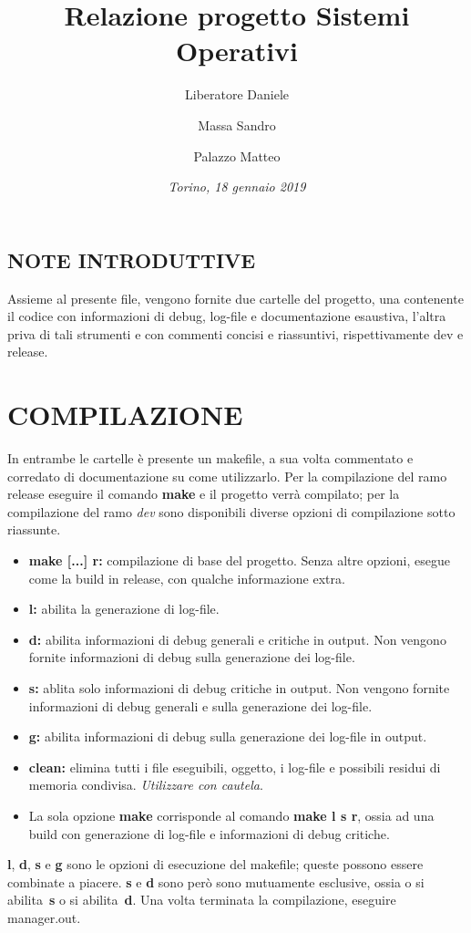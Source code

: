 \documentclass[a4paper,11pt]{article}
\newcommand{\cambiaFont}[2]{{\fontencoding{T1}\fontfamily{#1}%
\selectfont#2}}
\begin{document}
\author{Liberatore Daniele \and Massa Sandro \and Palazzo Matteo}
\title{Relazione progetto Sistemi Operativi}
\date{\textit{Torino, 18 gennaio 2019}}
\maketitle

\subsection*{NOTE INTRODUTTIVE}
Assieme al presente file, vengono fornite due cartelle del progetto, una contenente il codice con informazioni di debug, log-file e documentazione esaustiva, l’altra priva di tali strumenti e con commenti concisi e riassuntivi, rispettivamente \cambiaFont{pcr}{dev} e \cambiaFont{pcr}{release}.

\section{COMPILAZIONE}

In entrambe le cartelle è presente un \cambiaFont{pcr}{makefile}, a sua volta commentato e corredato di documentazione su come utilizzarlo. Per la compilazione del ramo \cambiaFont{pcr}{release} eseguire il comando \textbf{make} e il progetto verrà compilato; per la compilazione del ramo \textit{dev} sono disponibili diverse opzioni di compilazione sotto riassunte. 
\begin{itemize}
\item \textbf{make [...] r:} compilazione di base del progetto. Senza altre opzioni, esegue come la build in \cambiaFont{pcr}{release}, con qualche informazione extra.
\item \textbf{l:} abilita la generazione di log-file.
\item \textbf{d:} abilita informazioni di debug generali e critiche in output. Non vengono fornite informazioni di debug sulla generazione dei log-file.
\item \textbf{s:} ablita solo informazioni di debug critiche in output. Non vengono fornite informazioni
di debug generali e sulla generazione dei log-file.
\item \textbf{g:} abilita informazioni di debug sulla generazione dei log-file in output.
\item \textbf{clean:} elimina tutti i file eseguibili, oggetto, i log-file e possibili residui di memoria condivisa. \textit{Utilizzare con cautela}.
\item La sola opzione \textbf{make} corrisponde al comando \textbf{make l s r}, ossia ad una build con generazione di log-file e informazioni di debug critiche.
\end{itemize}
\textbf{l}, \textbf{d}, \textbf{s} e \textbf{g} sono le opzioni di esecuzione del \cambiaFont{pcr}{makefile}; queste possono essere combinate a piacere. \textbf{s} e \textbf{d} sono però sono mutuamente esclusive, ossia o si abilita~\textbf{s} o si abilita~\textbf{d}. Una volta terminata la compilazione, eseguire \cambiaFont{pcr}{manager.out}.
\end{document}

